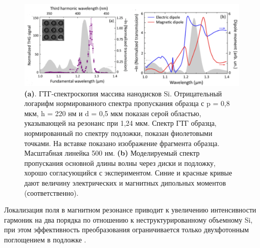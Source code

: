 \begin{figure}[h!]
    \centering
	\includegraphics[width=0.8\linewidth]{images/fig3.png}
	\caption{\textbf{(a)}. ГТГ-спектроскопия массива нанодисков Si. Отрицательный логарифм нормированного спектра пропускания образца с p = 0,8 мкм, h = 220 нм и d = 0,5 мкм показан серой областью, указывающей на резонанс при 1,24 мкм. Спектр ГТГ образца, нормированный по спектру подложки, показан фиолетовыми точками. На вставке показано изображение фрагмента образца. Масштабная линейка  500 нм. \textbf{(b)} Моделируемый спектр пропускания основной длины волны через диски и подложку, хорошо согласующийся с экспериментом. Синие и красные кривые дают величину электрических и магнитных дипольных моментов (соответственно). \cite{shcherbakov2014enhanced}}
	\label{nonliner:nanodisks}
\end{figure}
\hspace*{2mm}
Локализация поля в магнитном резонансе приводит к увеличению интенсивности гармоник на два порядка по отношению к неструктурированному объемному Si, при этом эффективность преобразования ограничивается только двухфотонным поглощением в подложке \cite{shcherbakov2014enhanced}. 


